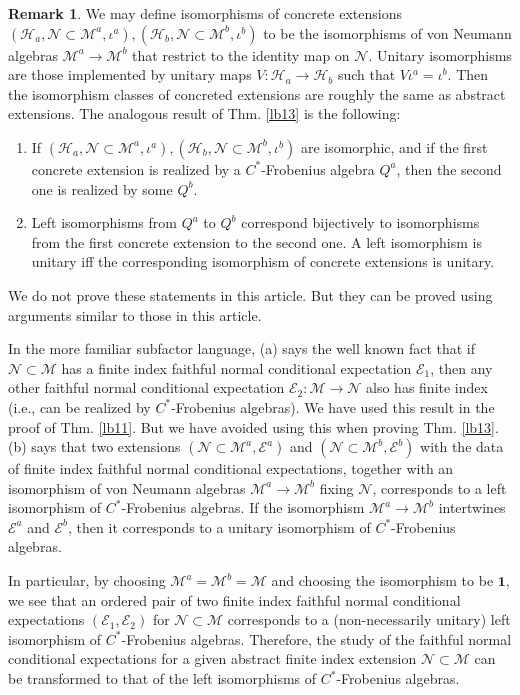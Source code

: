 \documentclass[11pt,b5paper,notitlepage]{article}
\theoremstyle{definition}
\newtheorem{rem}[df]{Remark}
\theoremstyle{plain}
\newcommand{\mc}{\mathcal}
\newcommand{\id}{\mathbf{1}}
\numberwithin{equation}{section}
\begin{document}
\begin{rem}
We may define isomorphisms of concrete extensions $(\mc H_a,\mc N\subset\mc M^a,\iota^a),(\mc H_b,\mc N\subset\mc M^b,\iota^b)$ to be the isomorphisms of von Neumann algebras $\mc M^a\rightarrow\mc M^b$ that restrict to the identity map on $\mc N$. Unitary isomorphisms are those implemented by unitary maps $V:\mc H_a\rightarrow\mc H_b$ such that $V\iota^a=\iota^b$. Then the isomorphism classes of concreted extensions are roughly the same as abstract extensions. The analogous result of Thm. \ref{lb13} is the following:
\begin{enumerate}[label=(\alph*)]
	\item If $(\mc H_a,\mc N\subset\mc M^a,\iota^a),(\mc H_b,\mc N\subset\mc M^b,\iota^b)$ are isomorphic, and if the first concrete extension is realized by a $C^*$-Frobenius algebra $Q^a$, then the second one is realized by some $Q^b$.
	\item Left isomorphisms from $Q^a$ to $Q^b$ correspond bijectively to isomorphisms from the first concrete extension to the second one. A left isomorphism is unitary iff the corresponding isomorphism of concrete extensions is unitary.
\end{enumerate}
We do not prove these statements in this article. But they can be proved using  arguments similar to  those in this article.

In the more familiar subfactor language, (a) says the well known fact that if $\mc N\subset\mc M$  has a finite index faithful normal conditional expectation $\mc E_1$, then any other faithful normal  conditional expectation $\mc E_2:\mc M\rightarrow\mc N$ also has finite index (i.e., can be realized by $C^*$-Frobenius algebras). We have used this result in the proof of Thm. \ref{lb11}. But we have avoided using this when proving Thm. \ref{lb13}. (b) says that two extensions $(\mc N\subset\mc M^a,\mc E^a)$ and $(\mc N\subset\mc M^b,\mc E^b)$ with the data of finite index faithful normal conditional expectations, together with an isomorphism of von Neumann algebras $\mc M^a\rightarrow\mc M^b$ fixing $\mc N$, corresponds  to a left isomorphism of $C^*$-Frobenius algebras. If the isomorphism $\mc M^a\rightarrow\mc M^b$ intertwines $\mc E^a$ and $\mc E^b$, then it corresponds to a unitary  isomorphism of $C^*$-Frobenius algebras.

In particular, by choosing $\mc M^a=\mc M^b=\mc M$ and choosing the isomorphism to be $\id$, we see that  an ordered pair of two finite index faithful normal conditional expectations $(\mc E_1,\mc E_2)$ for $\mc N\subset\mc M$ corresponds to a (non-necessarily unitary) left isomorphism of $C^*$-Frobenius algebras. Therefore, the study of the faithful normal conditional expectations for a given abstract finite index extension $\mc N\subset\mc M$ can be transformed  to that of  the left isomorphisms of $C^*$-Frobenius algebras. 


\end{rem}
\end{document}
